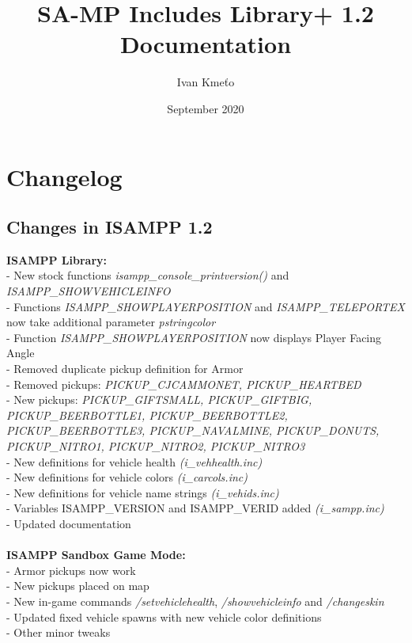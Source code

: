 \documentclass{article}
\title{SA-MP Includes Library+ 1.2 Documentation}
\author{Ivan Kmeťo}
\date{September 2020}
\begin{document}
\maketitle

\newpage
\tableofcontents

\newpage
\section{Changelog}

\subsection{Changes in ISAMPP 1.2}
\textbf{ISAMPP Library:}
\\- New stock functions \textit{isampp\_console\_printversion()} and \textit{ISAMPP\_SHOWVEHICLEINFO}
\\- Functions \textit{ISAMPP\_SHOWPLAYERPOSITION} and \textit{ISAMPP\_TELEPORTEX} now take additional parameter \textit{pstringcolor}
\\- Function \textit{ISAMPP\_SHOWPLAYERPOSITION} now displays Player Facing Angle
\\- Removed duplicate pickup definition for Armor
\\- Removed pickups: \textit{PICKUP\_CJCAMMONET, PICKUP\_HEARTBED}
\\- New pickups: \textit{PICKUP\_GIFTSMALL, PICKUP\_GIFTBIG, PICKUP\_BEERBOTTLE1, PICKUP\_BEERBOTTLE2, PICKUP\_BEERBOTTLE3, PICKUP\_NAVALMINE, PICKUP\_DONUTS, PICKUP\_NITRO1, PICKUP\_NITRO2, PICKUP\_NITRO3}
\\- New definitions for vehicle health \textit{(i\_vehhealth.inc)}
\\- New definitions for vehicle colors \textit{(i\_carcols.inc)}
\\- New definitions for vehicle name strings \textit{(i\_vehids.inc)}
\\- Variables ISAMPP\_VERSION and ISAMPP\_VERID added \textit{(i\_sampp.inc)}
\\- Updated documentation
\\
\\
\textbf{ISAMPP Sandbox Game Mode:}
\\- Armor pickups now work
\\- New pickups placed on map
\\- New in-game commands \textit{/setvehiclehealth}, \textit{/showvehicleinfo} and \textit{/changeskin}
\\- Updated fixed vehicle spawns with new vehicle color definitions
\\- Other minor tweaks
\end{document}
